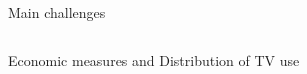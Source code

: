 \documentclass[final]{beamer}
\newcounter{acolumn}%
\def\autoheight{\vspace*{0pt}}%
\begin{document}
\begin{frame}
\begin{acolumns}[t]
\begin{column}{.24\linewidth}
\begin{block}{Main challenges}
                            \autoheight 
                          \end{block}
                          
                        
        \end{column}
                        
          
        
    
  
              \begin{column}{.48\linewidth}
              
                
             
                \begin{block}{Economic measures and Distribution of TV use}
                	
                 \begin{figure}
                 \centering
                 

\end{figure}
\end{block}
\end{column}
\end{acolumns}
\end{frame}
\end{document}
